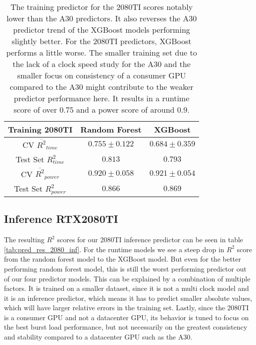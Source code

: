 \begin{table}[h!]
\centering
\begin{tabular}{|c|c|c|}
\hline
 \textbf{Training 2080TI}& \textbf{Random Forest} & \textbf{XGBoost} \\
\hline
CV $\overline{R^2}_{time}$ & $0.755 \pm 0.122$ &  $0.684 \pm 0.359$ \\
\hline
Test Set $R^2_{time}$ & $0.813$ & $0.793$ \\
\hline
CV $\overline{R^2}_{power}$ & $0.920 \pm 0.058$  &  $0.921 \pm 0.054$\\
\hline
Test Set $R^2_{power}$ & $0.866$ & $0.869$ \\
\hline
\end{tabular}
\caption{The training predictor for the 2080TI scores notably lower than the A30 predictors. It also reverses the A30 predictor trend of the XGBoost models performing slightly better. For the 2080TI predictors, XGBoost performs a little worse. The smaller training set due to the lack of a clock speed study for the A30 and the smaller focus on consistency of a consumer GPU compared to the A30 might contribute to the weaker predictor performance here. It results in a runtime score of over $0.75$ and a power score of around $0.9$.}
\label{tab:pred_res_2080}
\end{table}

\subsection{Inference RTX2080TI}

The resulting $R^2$ scores for our 2080TI inference predictor can be seen in table \ref{tab:pred_res_2080_inf}. For the runtime models we see a steep drop in $R^2$ score from the random forest model to the XGBoost model. But even for the better performing random forest model, this is still the worst performing predictor out of our four predictor models. This can be explained by a combination of multiple factors. It is trained on a smaller dataset, since it is not a multi clock model and it is an inference predictor, which means it has to predict smaller absolute values, which will have larger relative errors in the training set. Lastly, since the 2080TI is a consumer GPU and not a datacenter GPU, its behavior is tuned to focus on the best burst load performance, but not necessarily on the greatest consistency and stability compared to a datacenter GPU such as the A30.


